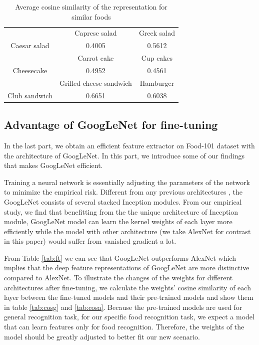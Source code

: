 \begin{table}[htbp]
  \centering
  \caption{Average cosine similarity of the representation for similar foods}
    \begin{tabular}{c|c|c}
    \toprule
          & Caprese salad & Greek salad \\
    Caesar salad & 0.4005& 0.5612 \\
    \toprule
          & Carrot cake & Cup cakes \\
    Cheesecake & 0.4952 & 0.4561 \\
    \toprule
          & Grilled cheese sandwich & Hamburger \\
    Club sandwich & 0.6651 & 0.6038 \\
    \bottomrule
    \end{tabular}%
  \label{tab:pre_sim}%
\end{table}%

\subsection{Advantage of GoogLeNet for fine-tuning}
In the last part, we obtain an efficient feature extractor on Food-101 dataset with the architecture of GoogLeNet. In this part, we introduce some of our findings that makes GoogLeNet efficient.

Training a neural network is essentially adjusting the parameters of the network to minimize the empirical risk. Different from any previous architectures \cite{krizhevsky2012imagenet}\cite{simonyan2014very}, the GoogLeNet consists of several stacked Inception modules. From our empirical study, we find that benefitting from the the unique architecture of Inception module, GoogLeNet model can learn the kernel weights of each layer more efficiently while the model with other architecture (we take AlexNet for contrast in this paper) would suffer from vanished gradient a lot.

From Table \ref{tab:ft} we can see that GoogLeNet outperforms AlexNet which implies that the deep feature representations of GoogLeNet are more distinctive compared to AlexNet.
To illustrate the changes of the weights for different architectures after fine-tuning, we calculate the weights' cosine similarity of each layer between the fine-tuned models and their pre-trained models and show them in table \ref{tab:cosg} and \ref{tab:cosa}. Because the pre-trained models are used for general recognition task, for our specific food recognition task, we expect a model that can learn features only for food recognition. Therefore, the weights of the model should be greatly adjusted to better fit our new scenario.

